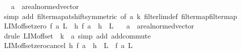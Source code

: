 \begin{isabellebody}
\ \ \ a\ {\isacharcolon}{\kern0pt}{\isacharcolon}{\kern0pt}\ {\isachardoublequoteopen}{\isacharprime}{\kern0pt}a{\isacharcolon}{\kern0pt}{\isacharcolon}{\kern0pt}real{\isacharunderscore}{\kern0pt}normed{\isacharunderscore}{\kern0pt}vector{\isachardoublequoteclose}\isanewline
%
\isadelimproof
\ \ %
\endisadelimproof
%
\isatagproof
{}\isamarkupfalse%
\ {\isacharparenleft}{\kern0pt}simp\ add{\isacharcolon}{\kern0pt}\ filtermap{\isacharunderscore}{\kern0pt}at{\isacharunderscore}{\kern0pt}shift{\isacharbrackleft}{\kern0pt}symmetric{\isacharcomma}{\kern0pt}\ of\ a\ k{\isacharbrackright}{\kern0pt}\ filterlim{\isacharunderscore}{\kern0pt}def\ filtermap{\isacharunderscore}{\kern0pt}filtermap{\isacharparenright}{\kern0pt}%
\endisatagproof
{\isafoldproof}%
%
\isadelimproof
\isanewline
%
\endisadelimproof
\isanewline
{}\isamarkupfalse%
\ LIM{\isacharunderscore}{\kern0pt}offset{\isacharunderscore}{\kern0pt}zero{\isacharcolon}{\kern0pt}\ {\isachardoublequoteopen}f\ {\isasymmidarrow}a{\isasymrightarrow}\ L\ {\isasymLongrightarrow}\ {\isacharparenleft}{\kern0pt}{\isasymlambda}h{\isachardot}{\kern0pt}\ f\ {\isacharparenleft}{\kern0pt}a\ {\isacharplus}{\kern0pt}\ h{\isacharparenright}{\kern0pt}{\isacharparenright}{\kern0pt}\ {\isasymmidarrow}{}{\isasymrightarrow}\ L{\isachardoublequoteclose}\isanewline
\ \ \ a\ {\isacharcolon}{\kern0pt}{\isacharcolon}{\kern0pt}\ {\isachardoublequoteopen}{\isacharprime}{\kern0pt}a{\isacharcolon}{\kern0pt}{\isacharcolon}{\kern0pt}real{\isacharunderscore}{\kern0pt}normed{\isacharunderscore}{\kern0pt}vector{\isachardoublequoteclose}\isanewline
%
\isadelimproof
\ \ %
\endisadelimproof
%
\isatagproof
{}\isamarkupfalse%
\ {\isacharparenleft}{\kern0pt}drule\ LIM{\isacharunderscore}{\kern0pt}offset\ {\isacharbrackleft}{\kern0pt}\ k\ {\isacharequal}{\kern0pt}\ a{\isacharbrackright}{\kern0pt}{\isacharparenright}{\kern0pt}\ {\isacharparenleft}{\kern0pt}simp\ add{\isacharcolon}{\kern0pt}\ add{\isachardot}{\kern0pt}commute{\isacharparenright}{\kern0pt}%
\endisatagproof
{\isafoldproof}%
%
\isadelimproof
\isanewline
%
\endisadelimproof
\isanewline
{}\isamarkupfalse%
\ LIM{\isacharunderscore}{\kern0pt}offset{\isacharunderscore}{\kern0pt}zero{\isacharunderscore}{\kern0pt}cancel{\isacharcolon}{\kern0pt}\ {\isachardoublequoteopen}{\isacharparenleft}{\kern0pt}{\isasymlambda}h{\isachardot}{\kern0pt}\ f\ {\isacharparenleft}{\kern0pt}a\ {\isacharplus}{\kern0pt}\ h{\isacharparenright}{\kern0pt}{\isacharparenright}{\kern0pt}\ {\isasymmidarrow}{}{\isasymrightarrow}\ L\ {\isasymLongrightarrow}\ f\ {\isasymmidarrow}a{\isasymrightarrow}\ L{\isachardoublequoteclose}\isanewline

\end{isabellebody}
